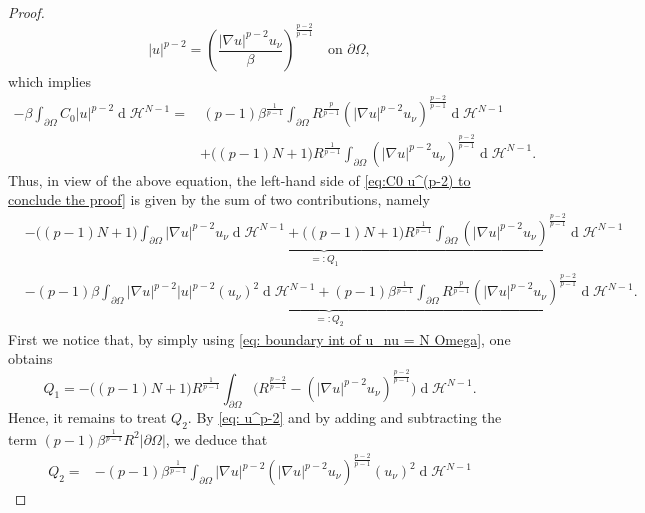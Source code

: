 \documentclass[10pt,a4paper, reqno]{amsart}
\numberwithin{equation}{section}
\renewcommand{\d}[1]{\ensuremath{\operatorname{d}\!{#1}}}
\begin{document}
\begin{proof}
\begin{equation}
        |u|^{p-2} = \left(\frac{|\nabla u|^{p-2} u_\nu}{\beta}\right)^\frac{p-2}{p-1} \quad \text{on }\partial\Omega,
    \end{equation}
    which implies 
    \begin{align*}
        -\beta \int_{\partial\Omega} C_0 |u|^{p-2} \d{}\mathcal{H}^{N-1} =& \,(p-1) \beta^{\frac{1}{p-1}} \int_{\partial\Omega} R^{\frac{p}{p-1}} (|\nabla u|^{p-2} u_\nu)^{\frac{p-2}{p-1}} \d{}\mathcal{H}^{N-1} 
        \\
        &+ \big( (p-1)N + 1 \big) R^{\frac{1}{p-1}} \int_{\partial\Omega}  (|\nabla u|^{p-2} u_\nu)^{\frac{p-2}{p-1}}  \d{}\mathcal{H}^{N-1}.
    \end{align*}        
    Thus, in view of the above equation, the left-hand side of \eqref{eq:C0 u^(p-2) to conclude the proof} is given by the sum of two contributions, namely
    \begin{equation}\label{eq:C0 u^(p-2) to conclude the proof 2}
    \begin{split}
    & \underbrace{- \big( (p-1)N + 1 \big)  \int_{\partial\Omega} |\nabla u|^{p-2} u_\nu \d{}\mathcal{H}^{N-1}
    + \big( (p-1)N + 1 \big) R^{\frac{1}{p-1}} \int_{\partial\Omega}  (|\nabla u|^{p-2} u_\nu)^{\frac{p-2}{p-1}}  \d{}\mathcal{H}^{N-1}}_{=:Q_1}
    \\
    & 
    \underbrace{- (p-1) \beta \int_{\partial\Omega} |\nabla u|^{p-2} |u|^{p-2} (u_\nu)^2 \d{}\mathcal{H}^{N-1} 
    + (p-1) \beta^{\frac{1}{p-1}} \int_{\partial\Omega} R^{\frac{p}{p-1}} (|\nabla u|^{p-2} u_\nu)^{\frac{p-2}{p-1}} \d{}\mathcal{H}^{N-1}}_{=:Q_2}.
    \end{split}
    \end{equation}
    First we notice that, by simply using \eqref{eq: boundary int of u_nu = N Omega}, one obtains 
    \begin{equation}\label{eq: Q1}
        Q_1 = - \big( (p-1)N + 1 \big) R^{\frac{1}{p-1}}  \int_{\partial\Omega} \Big( R^{\frac{p-2}{p-1}} - (|\nabla u|^{p-2} u_\nu)^{\frac{p-2}{p-1}} \Big)  \d{}\mathcal{H}^{N-1}.
    \end{equation}
    Hence, it remains to treat $Q_2$. By \eqref{eq: u^p-2} and by adding and subtracting the term $\displaystyle (p-1) \beta^{\frac{1}{p-1}}  R^2 |\partial\Omega|$, we deduce that 
    \begin{equation}\label{eq: Q_2 first}
    \begin{split}
    Q_2  =& - (p-1) \beta^{\frac{1}{p-1}} \int_{\partial\Omega} |\nabla u|^{p-2} (|\nabla u|^{p-2} u_\nu)^{\frac{p-2}{p-1}} (u_\nu)^2 \d{}\mathcal{H}^{N-1} 

\end{split}
\end{equation}
\end{proof}
\end{document}
